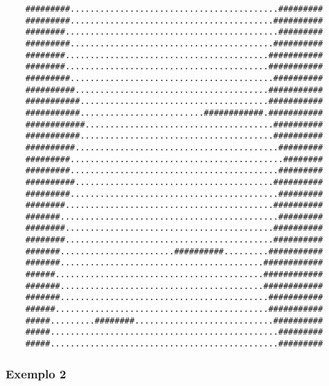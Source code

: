 \documentclass[a4paper,12pt]{article}
\begin{document}
    \bigskip
    \begin{verbatim}
    #########..........................................#########
    #########.........................................##########
    ########...........................................#########
    #########.........................................##########
    ########.........................................###########
    ########.........................................###########
    #########.........................................##########
    ##########.......................................###########
    ###########......................................###########
    ###########.........................############.###########
    ############......................................##########
    ###########.......................................##########
    ##########.........................................#########
    #########...........................................########
    #########..........................................#########
    ##########........................................##########
    #########..........................................#########
    ########..........................................##########
    #######............................................#########
    ########..........................................##########
    ########..........................................##########
    #######.......................##########.........###########
    #######.........................................############
    ######..........................................############
    #######.........................................############
    #######..........................................###########
    ######...........................................###########
    #####.........########............................##########
    #####..............................................#########
    #####..............................................#########
    \end{verbatim}
  
  \newpage %
    \subsubsection{\textcolor{NavyBlue}{Exemplo 2}}
    
\end{document}
